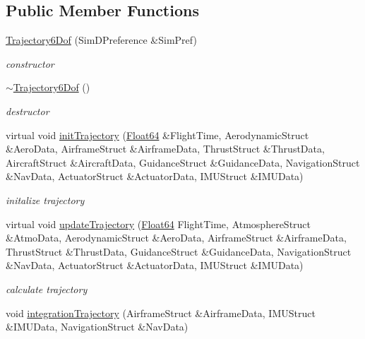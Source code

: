 \subsection*{Public Member Functions}
\begin{DoxyCompactItemize}
\item 
\hyperlink{class_trajectory6_dof_a1742bd5d7245f2bd1fb7fadf0ba23e0a}{Trajectory6\+Dof} (Sim\+D\+Preference \&Sim\+Pref)
\begin{DoxyCompactList}\small\item\em constructor \end{DoxyCompactList}\item 
\hyperlink{class_trajectory6_dof_a6bccf2060b63851fcc039ca1efb6f378}{$\sim$\+Trajectory6\+Dof} ()
\begin{DoxyCompactList}\small\item\em destructor \end{DoxyCompactList}\item 
virtual void \hyperlink{class_trajectory6_dof_a4e81b667130462a85ce047d4942b794c}{init\+Trajectory} (\hyperlink{group___tools_ga3f1431cb9f76da10f59246d1d743dc2c}{Float64} \&Flight\+Time, Aerodynamic\+Struct \&Aero\+Data, Airframe\+Struct \&Airframe\+Data, Thrust\+Struct \&Thrust\+Data, Aircraft\+Struct \&Aircraft\+Data, Guidance\+Struct \&Guidance\+Data, Navigation\+Struct \&Nav\+Data, Actuator\+Struct \&Actuator\+Data, I\+M\+U\+Struct \&I\+M\+U\+Data)
\begin{DoxyCompactList}\small\item\em initalize trajectory \end{DoxyCompactList}\item 
virtual void \hyperlink{class_trajectory6_dof_aafe86c414f4717075a3e0f40c0543fa1}{update\+Trajectory} (\hyperlink{group___tools_ga3f1431cb9f76da10f59246d1d743dc2c}{Float64} Flight\+Time, Atmosphere\+Struct \&Atmo\+Data, Aerodynamic\+Struct \&Aero\+Data, Airframe\+Struct \&Airframe\+Data, Thrust\+Struct \&Thrust\+Data, Guidance\+Struct \&Guidance\+Data, Navigation\+Struct \&Nav\+Data, Actuator\+Struct \&Actuator\+Data, I\+M\+U\+Struct \&I\+M\+U\+Data)
\begin{DoxyCompactList}\small\item\em calculate trajectory \end{DoxyCompactList}\item 
void \hyperlink{class_trajectory6_dof_a9ea303538f87c8043058c19b7f981839}{integration\+Trajectory} (Airframe\+Struct \&Airframe\+Data, I\+M\+U\+Struct \&I\+M\+U\+Data, Navigation\+Struct \&Nav\+Data)

\end{DoxyCompactItemize}
